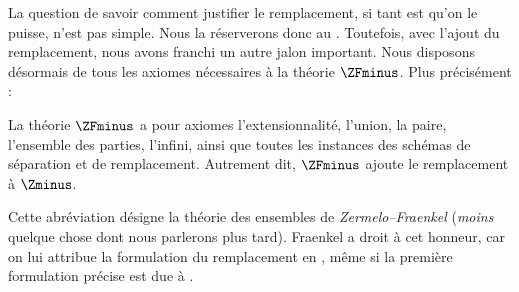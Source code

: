 \documentclass[../../../include/open-logic-section]{subfiles}
\begin{document}

La question de savoir comment justifier le remplacement, si tant est
qu'on le puisse, n'est pas simple. Nous la réserverons donc au
. Toutefois, avec l'ajout du
remplacement, nous avons franchi un autre jalon important. Nous
disposons désormais de tous les axiomes nécessaires à la théorie
$\ZFminus$. Plus précisément :

\begin{defn}
La théorie $\ZFminus$ a pour axiomes l'extensionnalité, l'union, la
paire, l'ensemble des parties, l'infini, ainsi que toutes les
instances des schémas de séparation et de remplacement. Autrement
dit, $\ZFminus$ ajoute le remplacement à $\Zminus$.
\end{defn}
\noindent
Cette abréviation désigne la théorie des ensembles de
\emph{Zermelo--Fraenkel} (\emph{moins} quelque chose dont nous
parlerons plus tard). Fraenkel a droit à cet honneur, car on lui
attribue la formulation du remplacement en
\citeyear{Fraenkel1922}, même si la première formulation précise est
due à \citet{Skolem1922}.
\end{document}

